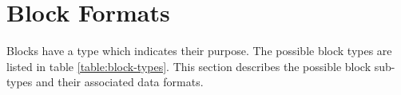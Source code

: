 \section{Block Formats} \label{sec:block-formats}

Blocks have a type which indicates their purpose. The possible block types are listed in table \ref{table:block-types}.
This section describes the possible block sub-types and their associated data formats.






